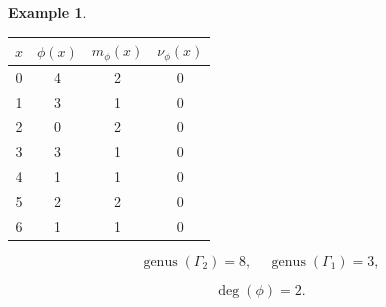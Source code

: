 \documentclass[12pt,letterpaper]{article}
\theoremstyle{definition}
\newtheorem{example}[theorem]{Example}
\DeclareMathOperator{\genus}{genus}
\begin{document}
\begin{example}
{\begin{center}
\begin{tabular}{c|c|c|c}  
  $x$ & $\phi(x)$ & $m_\phi(x)$ & $\nu_\phi(x)$ \\ \hline
  0   &    4   &        2         &  0   \\ 
  1   &    3   &        1         &  0  \\ 
  2   &    0   &        2         &  0  \\ 
  3   &    3   &        1         &  0  \\ 
  4   &    1   &        1         &  0   \\
  5   &    2   &        2         &  0   \\
  6   &    1   &        1         &  0   \\   
\end{tabular}
\end{center}

\[
  \genus(\Gamma_2) =8,\ \ \ \ \
  \genus(\Gamma_1) =3,
\]

\[
\deg(\phi) =2.
\]

}
\end{example}
\end{document}
